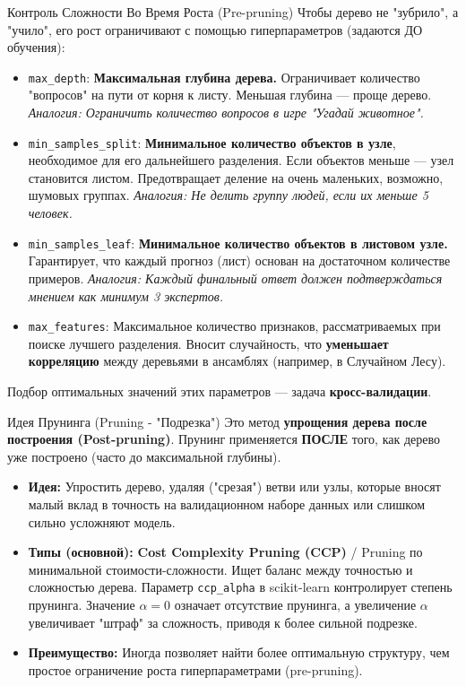 \begin{myexampleblock}{Контроль Сложности Во Время Роста (Pre-pruning)}
    Чтобы дерево не "зубрило", а "учило", его рост ограничивают с помощью гиперпараметров (задаются ДО обучения):
    \begin{itemize}
        \item \texttt{max\_depth}: \textbf{Максимальная глубина дерева.} Ограничивает количество "вопросов" на пути от корня к листу. Меньшая глубина — проще дерево. \textit{Аналогия: Ограничить количество вопросов в игре "Угадай животное".}
        \item \texttt{min\_samples\_split}: \textbf{Минимальное количество объектов в узле}, необходимое для его дальнейшего разделения. Если объектов меньше — узел становится листом. Предотвращает деление на очень маленьких, возможно, шумовых группах. \textit{Аналогия: Не делить группу людей, если их меньше 5 человек.}
        \item \texttt{min\_samples\_leaf}: \textbf{Минимальное количество объектов в листовом узле.} Гарантирует, что каждый прогноз (лист) основан на достаточном количестве примеров. \textit{Аналогия: Каждый финальный ответ должен подтверждаться мнением как минимум 3 экспертов.}
        \item \texttt{max\_features}: Максимальное количество признаков, рассматриваемых при поиске лучшего разделения. Вносит случайность, что \textbf{уменьшает корреляцию} между деревьями в ансамблях (например, в Случайном Лесу).
    \end{itemize}
    Подбор оптимальных значений этих параметров — задача \textbf{кросс-валидации}.
\end{myexampleblock}

\begin{myblock}{Идея Прунинга (Pruning - "Подрезка")}
    Это метод \textbf{упрощения дерева после построения (Post-pruning)}. Прунинг применяется \textbf{ПОСЛЕ} того, как дерево уже построено (часто до максимальной глубины).
    \begin{itemize}
        \item \textbf{Идея:} Упростить дерево, удаляя ("срезая") ветви или узлы, которые вносят малый вклад в точность на валидационном наборе данных или слишком сильно усложняют модель.
        \item \textbf{Типы (основной):} \textbf{Cost Complexity Pruning (CCP)} / Pruning по минимальной стоимости-сложности. Ищет баланс между точностью и сложностью дерева. Параметр \texttt{ccp\_alpha} в scikit-learn контролирует степень прунинга. Значение $\alpha=0$ означает отсутствие прунинга, а увеличение $\alpha$ увеличивает "штраф" за сложность, приводя к более сильной подрезке.
        \item \textbf{Преимущество:} Иногда позволяет найти более оптимальную структуру, чем простое ограничение роста гиперпараметрами (pre-pruning).
    \end{itemize}
\end{myblock}

